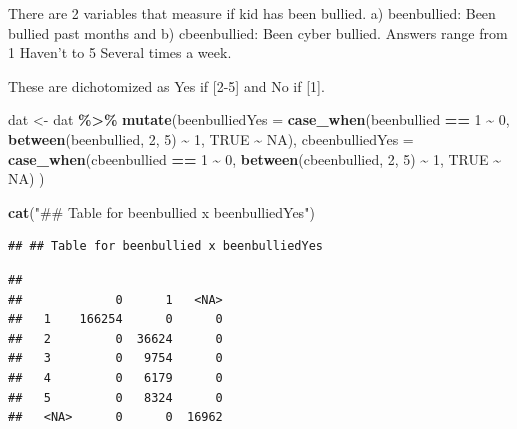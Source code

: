 \documentclass[
]{article}
\newenvironment{Shaded}{\begin{snugshade}}{\end{snugshade}}
\newcommand{\AttributeTok}[1]{\textcolor[rgb]{0.13,0.29,0.53}{#1}}
\newcommand{\ConstantTok}[1]{\textcolor[rgb]{0.56,0.35,0.01}{#1}}
\newcommand{\DecValTok}[1]{\textcolor[rgb]{0.00,0.00,0.81}{#1}}
\newcommand{\FunctionTok}[1]{\textcolor[rgb]{0.13,0.29,0.53}{\textbf{#1}}}
\newcommand{\NormalTok}[1]{#1}
\newcommand{\OtherTok}[1]{\textcolor[rgb]{0.56,0.35,0.01}{#1}}
\newcommand{\SpecialCharTok}[1]{\textcolor[rgb]{0.81,0.36,0.00}{\textbf{#1}}}
\newcommand{\StringTok}[1]{\textcolor[rgb]{0.31,0.60,0.02}{#1}}
\begin{document}
There are 2 variables that measure if kid has been bullied. a)
beenbullied: Been bullied past months and b) cbeenbullied: Been cyber
bullied. Answers range from 1 Haven't to 5 Several times a week.

These are dichotomized as Yes if {[}2-5{]} and No if {[}1{]}.

\begin{Shaded}
\begin{Highlighting}[]
\NormalTok{dat }\OtherTok{\textless{}{-}}\NormalTok{ dat }\SpecialCharTok{\%\textgreater{}\%}
  \FunctionTok{mutate}\NormalTok{(}\AttributeTok{beenbulliedYes =} 
           \FunctionTok{case\_when}\NormalTok{(beenbullied }\SpecialCharTok{==} \DecValTok{1} \SpecialCharTok{\textasciitilde{}} \DecValTok{0}\NormalTok{,}
                     \FunctionTok{between}\NormalTok{(beenbullied, }\DecValTok{2}\NormalTok{, }\DecValTok{5}\NormalTok{) }\SpecialCharTok{\textasciitilde{}} \DecValTok{1}\NormalTok{,}
                     \ConstantTok{TRUE} \SpecialCharTok{\textasciitilde{}} \ConstantTok{NA}\NormalTok{),}
         \AttributeTok{cbeenbulliedYes =} 
           \FunctionTok{case\_when}\NormalTok{(cbeenbullied }\SpecialCharTok{==} \DecValTok{1} \SpecialCharTok{\textasciitilde{}} \DecValTok{0}\NormalTok{,}
                     \FunctionTok{between}\NormalTok{(cbeenbullied, }\DecValTok{2}\NormalTok{, }\DecValTok{5}\NormalTok{) }\SpecialCharTok{\textasciitilde{}} \DecValTok{1}\NormalTok{,}
                     \ConstantTok{TRUE} \SpecialCharTok{\textasciitilde{}} \ConstantTok{NA}\NormalTok{)}
\NormalTok{           )}

\FunctionTok{cat}\NormalTok{(}\StringTok{"\#\# Table for beenbullied x beenbulliedYes"}\NormalTok{)}
\end{Highlighting}
\end{Shaded}

\begin{verbatim}
## ## Table for beenbullied x beenbulliedYes
\end{verbatim}

\begin{Shaded}
\end{Shaded}

\begin{verbatim}
##       
##             0      1   <NA>
##   1    166254      0      0
##   2         0  36624      0
##   3         0   9754      0
##   4         0   6179      0
##   5         0   8324      0
##   <NA>      0      0  16962
\end{verbatim}
\end{document}
